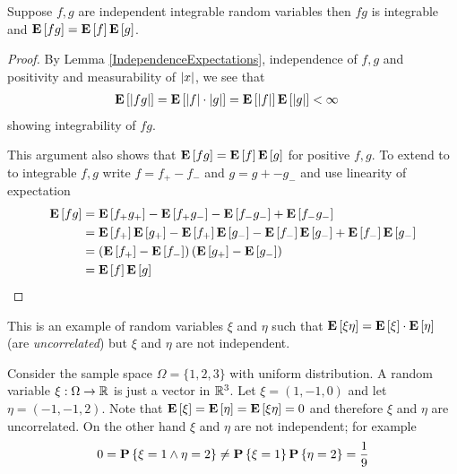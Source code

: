 \begin{cor}Suppose $f,g$ are independent integrable random variables
 then $fg$ is integrable and $\textbf{E}\left[fg\right] = \textbf{E}\left[f\right]\textbf{E}\left[g\right]$.
\end{cor}
\begin{proof}By Lemma
  \ref{IndependenceExpectations}, independence of $f,g$ and positivity and measurability of $\left \vert x \right \vert$, we see that 
\begin{align*}\textbf{E}\left[\left \vert fg \right \vert\right] &= \textbf{E}\left[\left \vert f \right \vert\cdot \left \vert g \right \vert\right] =
  \textbf{E}\left[\left \vert f \right \vert\right]\textbf{E}\left[\left \vert g \right \vert\right] < \infty
\end{align*}
showing integrability of $f g$.

This argument also shows that $\textbf{E}\left[fg\right] =
\textbf{E}\left[f\right]\textbf{E}\left[g\right]$ for positive $f,g$.  To extend to to
integrable $f,g$ write $f = f_+ - f_-$ and $g = g+ - g_-$ and use
linearity of expectation
\begin{align*}
\textbf{E}\left[fg\right] &= \textbf{E}\left[f_+ g_+\right] - \textbf{E}\left[f_+ g_-\right] -
\textbf{E}\left[f_- g_-\right] + \textbf{E}\left[f_- g_-\right] \\
&= \textbf{E}\left[f_+\right]\textbf{E}\left[g_+\right] - \textbf{E}\left[f_+\right]\textbf{E}\left[ g_-\right] -
\textbf{E}\left[f_-\right]\textbf{E}\left[ g_-\right] + \textbf{E}\left[f_-\right]\textbf{E}\left[
  g_-\right] \\
&= \left( \textbf{E}\left[f_+\right] - \textbf{E}\left[f_-\right]\right) \left( \textbf{E}\left[g_+\right] - \textbf{E}\left[g_-\right]\right)\\
&= \textbf{E}\left[f\right]\textbf{E}\left[g\right]
\end{align*}
\end{proof}

\begin{examp}\label{UncorrelatedNotIndependent}This is an example of random variables $\xi$ and
  $\eta$ such that $\textbf{E}\left[\xi \eta\right] =
  \textbf{E}\left[\xi\right] \cdot \textbf{E}\left[\eta\right]$ (are
  \emph{uncorrelated}) but $\xi$ and $\eta$ are
  not independent.

Consider the sample space $\Omega = \{1,2,3\}$ with uniform distribution.  A
random variable $\xi:\Omega \to \mathbb{R}$ is just a vector in $\mathbb{R}^3$.  Let $\xi = (1,-1,0)$
and let $\eta=(-1,-1,2)$.  Note that
$\textbf{E}\left[\xi\right]=\textbf{E}\left[\eta\right] = \textbf{E}\left[\xi \eta\right] = 0$
and therefore $\xi$ and $\eta$ are uncorrelated.  On the other hand
$\xi$ and $\eta$ are not independent; for example 
\begin{align*}
0=\textbf{P}\left \{\xi=1
  \wedge \eta = 2 \right \} \neq
\textbf{P}\left \{\xi=1 \right \}\textbf{P}\left \{\eta=2 \right \}=\frac{1}{9}
\end{align*}
\end{examp}

